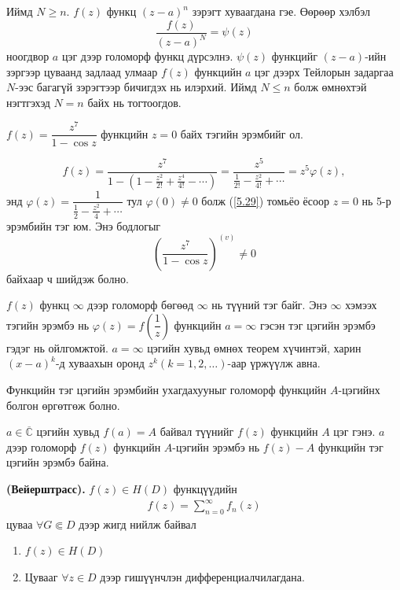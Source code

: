 Иймд $N\geq n$. $f(z)$ функц $(z-a)^n$ зэрэгт хуваагдана гэе.
Өөрөөр хэлбэл
$$\frac{f(z)}{(z-a)^N}=\psi(z)$$
ноогдвор $a$ цэг дээр голоморф функц дүрсэлнэ. $\psi (z)$ функцийг $(z-a)$-ийн зэргээр цуваанд задлаад улмаар $f(z)$ функцийн $a$ цэг дээрх Тейлорын задаргаа $N$-ээс багагүй зэрэгтээр бичигдэх нь илэрхий. Иймд $N\leq n$ болж өмнөхтэй нэгтгэхэд $N=n$ байх нь тогтоогдов.
\begin{exm}
$f(z)=\dfrac{z^7}{1-\cos z}$ функцийн $z=0$ байх тэгийн эрэмбийг ол.
\end{exm}
\begin{sol}
$$f(z)=\frac{z^7}{1-\left(1-\frac{z^2}{2!}+\frac{z^4}{4!}-\cdots \right)}=\frac{z^5}{\frac{1}{2!}-\frac{z^2}{4!}+\cdots}=z^5\varphi(z),$$ энд $\varphi (z)=\dfrac{1}{\frac{1}{2}-\frac{z^2}{4}+\cdots}$ тул $\varphi (0)\neq 0$ болж (\ref{5.29}) томьёо ёсоор $z=0$ нь 5-р эрэмбийн тэг юм. Энэ бодлогыг 
$$\left(\frac{z^7}{1-\cos z}\right)^{(v)}\neq 0$$
байхаар ч шийдэж болно. 
\end{sol}
\begin{hnt}
$f(z)$ функц $\infty$ дээр голоморф бөгөөд $\infty$ нь түүний тэг байг. Энэ $\infty$ хэмээх тэгийн эрэмбэ нь $\varphi (z)=f\left(\dfrac{1}{z}\right)$ функцийн $a=\infty$ гэсэн тэг цэгийн эрэмбэ гэдэг нь ойлгомжтой. $a=\infty$ цэгийн хувьд өмнөх теорем хүчинтэй, харин $(x-a)^k$-д хуваахын оронд $z^k(k=1,2,\ldots)$-аар үржүүлж авна.

Функцийн тэг цэгийн эрэмбийн ухагдахууныг голоморф функцийн $A$-цэгийнх болгон өргөтгөж болно.

$a\in\overline{\mathbb{C}}$ цэгийн хувьд $f(a)=A$ байвал түүнийг $f(z)$ функцийн $A$ цэг  гэнэ. $a$ дээр голоморф $f(z)$ функцийн $A$-цэгийн эрэмбэ  нь $f(z)-A$ функцийн тэг цэгийн эрэмбэ байна.
\end{hnt}
\begin{thm}
\textbf{(Вейерштрасс).}  $f(z)\in H(D)$ функцүүдийн
\begin{eqnarray} \label{5.32}
     f(z)=\sum\limits_{n=0}^\infty f_n(z)
\end{eqnarray} 
цуваа $\forall G\Subset D$ дээр жигд нийлж байвал
\begin{enumerate}
    \item $f(z)\in H(D)$
    \item Цувааг $\forall z\in D$ дээр гишүүнчлэн дифференциалчилагдана. 
\end{enumerate}
\end{thm}
